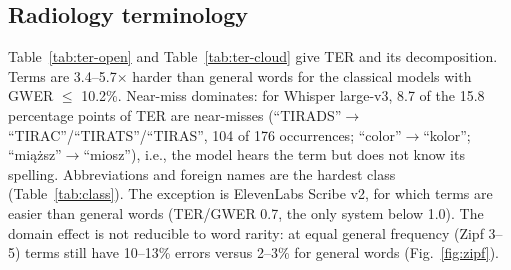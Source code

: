 \documentclass[conference]{IEEEtran}
\begin{document}
\subsection{Radiology terminology}
Table~\ref{tab:ter-open} and Table~\ref{tab:ter-cloud} give TER and its decomposition. Terms are 3.4--5.7$\times$ harder than general words for the classical models with GWER $\le$ 10.2\%. Near-miss dominates: for Whisper large-v3, 8.7 of the 15.8 percentage points of TER are near-misses (``TIRADS''$\to$``TIRAC''/``TIRATS''/``TIRAS'', 104 of 176 occurrences; ``color''$\to$``kolor''; ``mi\k{a}\.{z}sz''$\to$``miosz''), i.e., the model hears the term but does not know its spelling. Abbreviations and foreign names are the hardest class (Table~\ref{tab:class}). The exception is ElevenLabs Scribe v2, for which terms are easier than general words (TER/GWER 0.7, the only system below 1.0). The domain effect is not reducible to word rarity: at equal general frequency (Zipf 3--5) terms still have 10--13\% errors versus 2--3\% for general words (Fig.~\ref{fig:zipf}).
\end{document}
